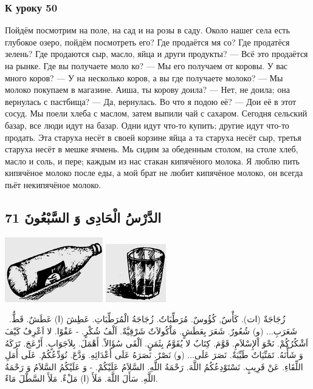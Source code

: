 \documentclass[a5paper]{article}
\begin{document}
\subsubsection{К уроку 50}
Пойдём посмотрим на поле, на сад и на розы в саду. Около нашег села есть глубокое озеро, пойдём посмотреть его? Где продаётся мя со? Где продатёся зелень? Где продаются сыр, масло, яйца и други продукты? — Всё это продаётся на рынке. Где вы получаете моло ко? — Мы его получаем от коровы. У вас много коров? — У на несколько коров, а вы где получаете молоко? — Мы молоко покупаем в магазине. Аиша, ты корову доила? — Нет, не доила; она вернулась с пастбища? — Да, вернулась. Во что я подою её? — Дои её в этот сосуд. Мы поели хлеба с маслом, затем выпили чай с сахаром. Сегодня сельский базар, все люди идут на базар. Одни идут что-то купить; другие идут что-то продать. Эта старуха несёт в своей корзине яйца а та старуха несёт сыр, третья старуха несёт в мешке ячмень. Мь сидим за обеденным столом, на столе хлеб, масло и соль, и пере; каждым из нас стакан кипячёного молока. Я люблю пить кипячёное молоко после еды, а мой брат не любит кипячёное молоко, он всегда пьёт некипячёное молоко.

\subsection{الدَّرْسُ الْحَادِى وَ السَّبْعُونَ 71}
 \includegraphics[width=1.6772in,height=1.1146in]{images/MuhammadBagauddinprettified-img223.png}   \includegraphics[width=1.0311in,height=1in]{images/MuhammadBagauddinprettified-img224.png} 

\ زُجَاجَةٌ (ات). كَأْسٌ, كُؤُوسٌ. مُرَطِّبَاتٌ. زُجَاجَةُ الْمُرَطِّبَاتِ. عَطِشَ (ا) عَطَشٌ. قَطُّ. \newline
شَعَرَبِ... (و) شُعُورٌ. شَعَرَ بِعَطَشٍ. مَاْكُولاَتٌ شَرْقِيَّةٌ. اَلْفُ شُكْرٍ. - عَفْوًا. لا اَعْرِفُ كَيْفَ اَشْكُرُكُمْ. نَحْوَ اْلإِسْلاَمِ. قَوَّمَ. كِتَابٌ لا يُقَوَّمُ بِثَمَنٍ. اَلْقَى سُؤَالاً. أَهْمَلَ. بِلاَجَوَابٍ. أَزْعَجَ. تَرَكَهُ وَ شَأْنَهُ. تَمَنِّيَاتٌ طَيِّبَةٌ. \newline
نَصَرَ عَلَى... (و) نَصْرٌ. نَصَرَهُ عَلَى أَعْدَائِهِ. وَدَّعَ. نُوَدِّعُكُمْ. عَلَى أَمَلِ اللِّقَاءِ. عَنْ قَرِيبٍ. نَسْتَوْدِعُكُمُ اللَّهَ. رَحْمَةُ اللَّهِ. السَّلاَمُ عَلَيْكُمْ. - وَ عَلَيْكُمُ السَّلاَمُ وَ رَحْمَةُ اللَّهِ. سَأَلَ اللَّهَ. مَلَأَ (ا) مَلْءٌ. مَلَأَ السَّطْلَ مَاءً.
\end{document}
